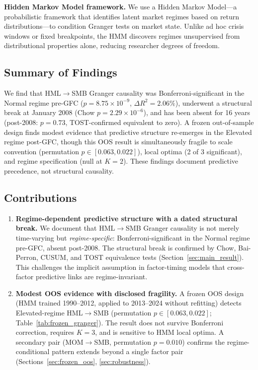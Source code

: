 \documentclass[sigconf,anonymous]{acmart}
\begin{document}
\textbf{Hidden Markov Model framework.} We use a Hidden Markov Model---a
probabilistic framework that identifies latent market regimes based on return
distributions---to condition Granger tests on market state. Unlike ad hoc crisis
windows or fixed breakpoints, the HMM discovers regimes unsupervised from
distributional properties alone, reducing researcher degrees of freedom.

\subsection{Summary of Findings}

We find that HML$\to$SMB Granger causality was Bonferroni-significant in the
Normal regime pre-GFC ($p = 8.75 \times 10^{-9}$, $\Delta R^2 = 2.06\%$),
underwent a structural break at January 2008 (Chow $p = 2.29\times10^{-6}$),
and has been absent for 16 years (post-2008: $p = 0.73$, TOST-confirmed
equivalent to zero).
A frozen out-of-sample design finds modest evidence that predictive structure
re-emerges in the Elevated regime post-GFC, though this OOS result is
simultaneously fragile to scale convention (permutation $p \in [0.063, 0.022]$),
local optima (2 of 3 significant), and regime specification (null at $K = 2$).
These findings document predictive precedence, not structural causality.

\subsection{Contributions}

\begin{enumerate}
    \item \textbf{Regime-dependent predictive structure with a dated structural break.}
    We document that HML$\to$SMB Granger causality is not merely time-varying
    but \emph{regime-specific}: Bonferroni-significant in the Normal regime
    pre-GFC, absent post-2008. The structural break is confirmed by Chow,
    Bai-Perron, CUSUM, and TOST equivalence tests
    (Section~\ref{sec:main_result}). This challenges the implicit assumption
    in factor-timing models that cross-factor predictive links are
    regime-invariant.

    \item \textbf{Modest OOS evidence with disclosed fragility.}
    A frozen OOS design (HMM trained 1990--2012, applied to 2013--2024
    without refitting) detects Elevated-regime HML$\to$SMB
    (permutation $p \in [0.063, 0.022]$; Table~\ref{tab:frozen_granger}).
    The result does not survive Bonferroni correction, requires $K = 3$,
    and is sensitive to HMM local optima.
    A secondary pair (MOM$\to$SMB, permutation $p = 0.010$) confirms
    the regime-conditional pattern extends beyond a single factor pair
    (Sections~\ref{sec:frozen_oos}, \ref{sec:robustness}).
\end{enumerate}
\end{document}
